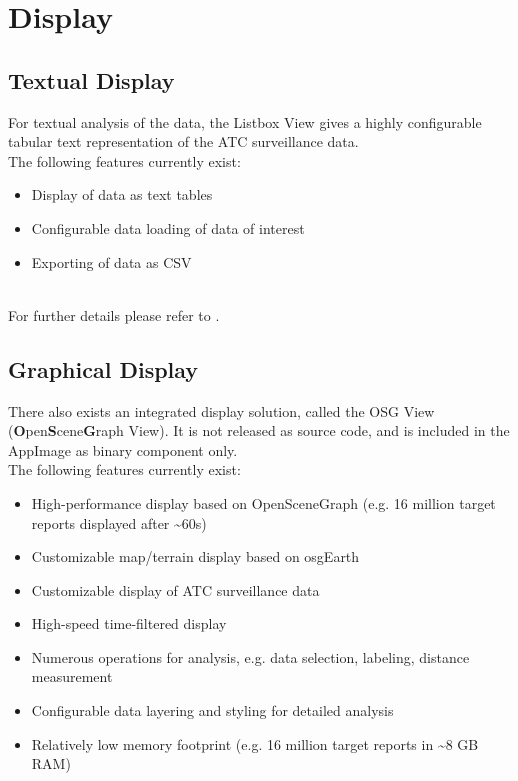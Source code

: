 \section{Display}

\subsection{Textual Display}

For textual analysis of the data, the Listbox View gives a highly configurable tabular text representation of the ATC surveillance data. \\

The following features currently exist:

\begin{itemize}  
\item Display of data as text tables
\item Configurable data loading of data of interest
\item Exporting of data as CSV
\end{itemize} 
\ \\

For further details please refer to .

\subsection{Graphical Display}
There also exists an integrated display solution, called the OSG View (\textbf{O}pen\textbf{S}cene\textbf{G}raph View). It is not released as source code, and is included in the AppImage as binary component only. \\

The following features currently exist:

\begin{itemize}  
\item High-performance display based on OpenSceneGraph (e.g. 16 million target reports displayed after \textasciitilde60s)
\item Customizable map/terrain display based on osgEarth
\item Customizable display of ATC surveillance data
\item High-speed time-filtered display
\item Numerous operations for analysis, e.g. data selection, labeling, distance measurement
\item Configurable data layering and styling for detailed analysis
\item Relatively low memory footprint (e.g. 16 million target reports in \textasciitilde8 GB RAM)
\end{itemize} 
\ \\

